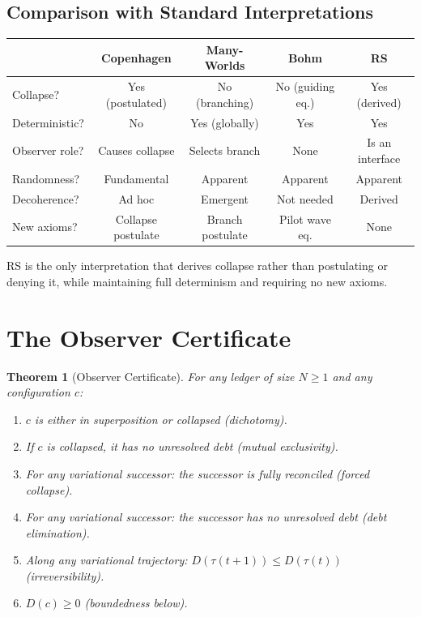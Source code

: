 \documentclass[11pt,a4paper]{article}
\theoremstyle{plain}
\newtheorem{theorem}{Theorem}[section]
\theoremstyle{definition}
\theoremstyle{remark}
\begin{document}
\subsection{Comparison with Standard Interpretations}

\begin{center}
\begin{tabular}{@{}lcccc@{}}
\toprule
& \textbf{Copenhagen} & \textbf{Many-Worlds} & \textbf{Bohm} & \textbf{RS} \\
\midrule
Collapse? & Yes (postulated) & No (branching) & No (guiding eq.) & Yes (derived) \\
Deterministic? & No & Yes (globally) & Yes & Yes \\
Observer role? & Causes collapse & Selects branch & None & Is an interface \\
Randomness? & Fundamental & Apparent & Apparent & Apparent \\
Decoherence? & Ad hoc & Emergent & Not needed & Derived \\
New axioms? & Collapse postulate & Branch postulate & Pilot wave eq. & None \\
\bottomrule
\end{tabular}
\end{center}

RS is the only interpretation that derives collapse rather than postulating or denying it, while maintaining full determinism and requiring no new axioms.

\section{The Observer Certificate}\label{sec:certificate}

\begin{theorem}[Observer Certificate]\label{thm:certificate}
For any ledger of size $N \ge 1$ and any configuration $c$:
\begin{enumerate}[nosep,label=(\roman*)]
\item $c$ is either in superposition or collapsed (dichotomy).
\item If $c$ is collapsed, it has no unresolved debt (mutual exclusivity).
\item For any variational successor: the successor is fully reconciled (forced collapse).
\item For any variational successor: the successor has no unresolved debt (debt elimination).
\item Along any variational trajectory: $D(\tau(t{+}1)) \le D(\tau(t))$ (irreversibility).
\item $D(c) \ge 0$ (boundedness below).
\end{enumerate}
\end{theorem}
\end{document}
